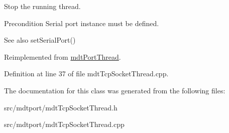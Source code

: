 Stop the running thread. 

\begin{DoxyPrecond}{Precondition}
Serial port instance must be defined. 
\end{DoxyPrecond}
\begin{DoxySeeAlso}{See also}
setSerialPort() 
\end{DoxySeeAlso}


Reimplemented from \hyperlink{classmdt_port_thread_a5746ea96689ed80179751ad1353f0b39}{mdtPortThread}.



Definition at line 37 of file mdtTcpSocketThread.cpp.



The documentation for this class was generated from the following files:\begin{DoxyCompactItemize}
\item 
src/mdtport/mdtTcpSocketThread.h\item 
src/mdtport/mdtTcpSocketThread.cpp\end{DoxyCompactItemize}
